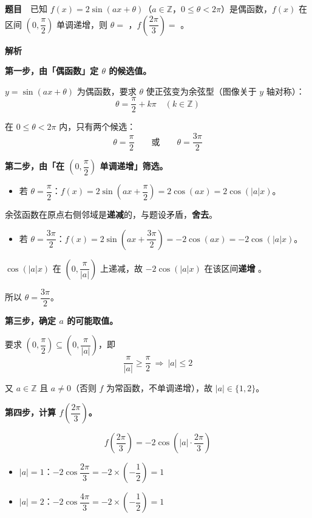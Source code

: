 \par\medskip


\textbf{题目}　已知 $f(x)=2\sin(ax+\theta)$（$a\in\mathbb{Z}$，$0\le\theta<2\pi$）是偶函数，$f(x)$ 在区间 $\left(0,\dfrac\pi2\right)$ 单调递增，则 $\theta=$ \gkblank{}，$f\left(\dfrac{2\pi}{3}\right)=$ \gkblank{}。

\textbf{解析}

\textbf{第一步，由「偶函数」定 $\theta$ 的候选值。}

$y=\sin(ax+\theta)$ 为偶函数，要求 $\theta$ 使正弦变为余弦型（图像关于 $y$ 轴对称）：
\[\theta=\frac\pi2+k\pi\quad(k\in\mathbb{Z})\]

在 $0\le\theta<2\pi$ 内，只有两个候选：
\[\theta=\frac\pi2\qquad\text{或}\qquad\theta=\frac{3\pi}{2}\]

\textbf{第二步，由「在 $\left(0,\dfrac\pi2\right)$ 单调递增」筛选。}

\begin{itemize}
\item 若 $\theta=\dfrac\pi2$：$f(x)=2\sin\left(ax+\dfrac\pi2\right)=2\cos(ax)=2\cos(|a|x)$。
\end{itemize}
  余弦函数在原点右侧邻域是\textbf{递减}的，与题设矛盾，\textbf{舍去}。
\begin{itemize}
\item 若 $\theta=\dfrac{3\pi}{2}$：$f(x)=2\sin\left(ax+\dfrac{3\pi}{2}\right)=-2\cos(ax)=-2\cos(|a|x)$。
\end{itemize}
  $\cos(|a|x)$ 在 $\left(0,\dfrac{\pi}{|a|}\right)$ 上递减，故 $-2\cos(|a|x)$ 在该区间\textbf{递增} 。

所以 $\theta=\dfrac{3\pi}{2}$。

\textbf{第三步，确定 $a$ 的可能取值。}

要求 $\left(0,\dfrac\pi2\right)\subseteq\left(0,\dfrac{\pi}{|a|}\right)$，即
\[\frac{\pi}{|a|}\ge\frac{\pi}{2}\ \Longrightarrow\ |a|\le 2\]

又 $a\in\mathbb{Z}$ 且 $a\ne0$（否则 $f$ 为常函数，不单调递增），故 $|a|\in\{1,2\}$。

\textbf{第四步，计算 $f\left(\dfrac{2\pi}{3}\right)$。}

\[f\left(\frac{2\pi}{3}\right)=-2\cos\left(|a|\cdot\frac{2\pi}{3}\right)\]

\begin{itemize}
\item $|a|=1$：$-2\cos\dfrac{2\pi}{3}=-2\times\left(-\dfrac12\right)=1$
\item $|a|=2$：$-2\cos\dfrac{4\pi}{3}=-2\times\left(-\dfrac12\right)=1$
\end{itemize}

